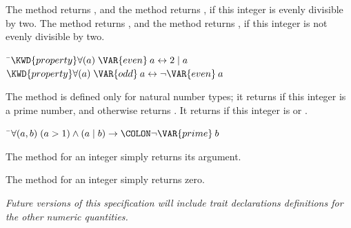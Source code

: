 The method  returns , and the method  returns ,
if this integer is evenly divisible by two.
The method  returns , and the method  returns ,
if this integer is not evenly divisible by two.


\begin{Fortress}
{\tt~}\pushtabs\=\+\( \KWD{property} \forall (a)\; \VAR{even}\:a \leftrightarrow 2 \mid a\)\\
\( \KWD{property} \forall (a)\; \VAR{odd}\:a \leftrightarrow \neg \VAR{even}\:a\)\-\\\poptabs
\end{Fortress}




The method  is defined only for natural number types;
it returns  if this integer is a prime number, and
otherwise returns .  It returns  if this
integer is  or .

\begin{Fortress}
{\tt~}\pushtabs\=\+\( \forall (a, b)\; (a > 1) \wedge (a \mid b) \rightarrow\COLON \neg \VAR{prime}\:b\)\-\\\poptabs
\end{Fortress}



The method  for an integer simply returns its argument.



The method  for an integer simply returns zero.













\emph{Future versions of this specification will include trait declarations
  definitions for the other numeric quantities.}




